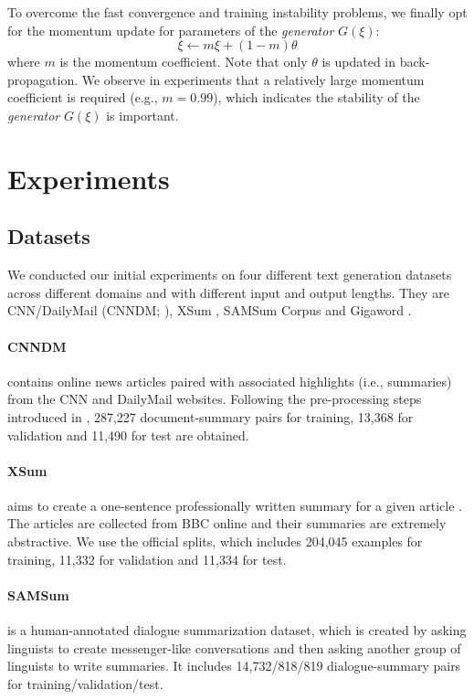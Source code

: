\documentclass{article}
\begin{document}
To overcome the fast convergence and training instability problems, we finally opt for the momentum update for parameters of the \emph{generator} $G(\xi)$:
\begin{equation}
    \xi \leftarrow m \xi + (1-m) \theta
\end{equation}
where $m$ is the momentum coefficient. Note that only $\theta$ is updated in back-propagation. We observe in experiments that a relatively large momentum coefficient is required (e.g., $m=0.99$), which indicates the stability of the \emph{generator} $G(\xi)$ is important.

\section{Experiments}

\subsection{Datasets}
We conducted our initial experiments on four different text generation datasets across different domains and with different input and output lengths. They are CNN/DailyMail (CNNDM; \citealt{nallapati2016abstractive}), XSum \citep{narayan2018don}, SAMSum Corpus \cite{gliwa-etal-2019-samsum} and Gigaword \citep{napoles2012annotated}.

\paragraph{CNNDM} contains online news articles paired with associated highlights (i.e., summaries) from the CNN and DailyMail websites. Following the pre-processing steps introduced in \cite{see-etal-2017-get},  287,227 document-summary pairs for training, 13,368 for validation and
11,490 for test are obtained.

\paragraph{XSum} aims to create a one-sentence professionally written summary for a given article \cite{narayan2018don}. The articles are collected from BBC online and their summaries are extremely abstractive. We use the official splits, which includes 204,045 examples for training, 11,332 for validation and 11,334 for test.

\paragraph{SAMSum} is a human-annotated dialogue summarization dataset, which is created by asking linguists to create messenger-like conversations and then asking another group of linguists to write summaries. It includes 14,732/818/819 dialogue-summary pairs for training/validation/test.
\end{document}
